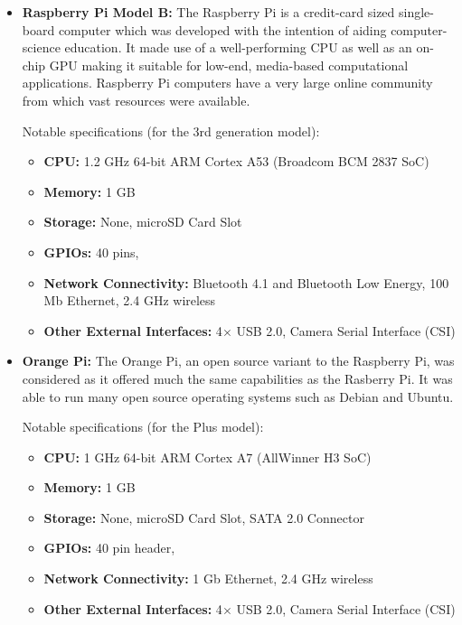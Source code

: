       \begin{itemize}
        \item \textbf{Raspberry Pi Model B:}
          The Raspberry Pi is a credit-card sized single-board computer which was developed with the intention of aiding computer-science education. It made use of a well-performing CPU as well as an on-chip GPU making it suitable for low-end, media-based computational applications. Raspberry Pi computers have a very large online community from which vast resources were available.
          
          Notable specifications (for the 3rd generation model):
          \begin{itemize}
            \item \textbf{CPU:} 1.2 GHz 64-bit ARM Cortex A53 (Broadcom BCM 2837 SoC)
            \item \textbf{Memory:} 1 GB
            \item \textbf{Storage:} None, microSD Card Slot
            \item \textbf{GPIOs:} 40 pins, 
            \item \textbf{Network Connectivity:} Bluetooth 4.1 and Bluetooth Low Energy, 100 Mb Ethernet, 2.4 GHz wireless
            \item \textbf{Other External Interfaces:} 4$\times$ USB 2.0, Camera Serial Interface (CSI)
          \end{itemize}
        \item \textbf{Orange Pi:}
          The Orange Pi, an open source variant to the Raspberry Pi, was considered as it offered much the same capabilities as the Rasberry Pi. It was able to run many open source operating systems such as Debian and Ubuntu.
          
          Notable specifications (for the Plus model):
          \begin{itemize}
            \item \textbf{CPU:} 1 GHz 64-bit ARM Cortex A7 (AllWinner H3 SoC)
            \item \textbf{Memory:} 1 GB
            \item \textbf{Storage:} None, microSD Card Slot, SATA 2.0 Connector
            \item \textbf{GPIOs:} 40 pin header, 
            \item \textbf{Network Connectivity:} 1 Gb Ethernet, 2.4 GHz wireless
            \item \textbf{Other External Interfaces:} 4$\times$ USB 2.0, Camera Serial Interface (CSI)
          \end{itemize}
          

\end{itemize}
